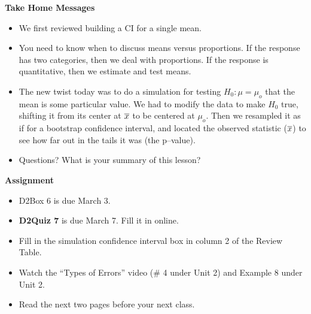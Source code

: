 \begin{center}
  {\bf Take Home Messages}\vspace{-.1in}
\end{center}

\begin{itemize}
\item We first reviewed building a CI for a single mean.
\item You need to know when to discuss means versus proportions.  If
  the response has two categories, then we deal with proportions.  If
  the response is quantitative, then we estimate and test means.
\item The new twist today was to do a simulation for testing $H_0: \mu
  = \mu_o$ that the mean is some particular value.  We had to modify
  the data to make $H_0$ true, shifting it from its center at $\overline{x}$ to
  be centered at $\mu_o$.  Then we resampled it as if for a bootstrap
  confidence interval, and located the observed statistic ($\overline{x}$) to
  see how far out in the tails it was (the p--value).

 \item 
Questions? What is your summary of this  lesson? \vfill

\end{itemize}



\noindent
{\bf Assignment} \vspace{-.2in}
\begin{itemize}
\item D2Box 6 is due March 3.
\item {\bf D2Quiz 7} is due March 7.  Fill it in online.
\item Fill in the simulation confidence interval box in column 2 of
  the Review Table.
\item Watch the ``Types of Errors'' video (\# 4 under Unit 2) and Example 8 under Unit 2.
\item Read the next two pages before your next class.
\end{itemize}
